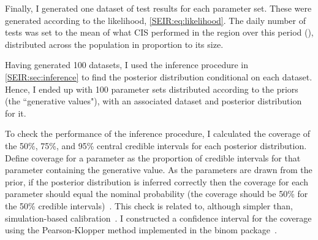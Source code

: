 \documentclass[thesis.tex]{subfiles}
\begin{document}
Finally, I generated one dataset of test results for each parameter set.
These were generated according to the likelihood, \cref{SEIR:eq:likelihood}.
The daily number of tests was set to the mean of what CIS performed in the region over this period (), distributed across the population in proportion to its size.

Having generated 100 datasets, I used the inference procedure in \cref{SEIR:sec:inference} to find the posterior distribution conditional on each dataset.
Hence, I ended up with 100 parameter sets distributed according to the priors (the ``generative values"), with an associated dataset and posterior distribution for it.

To check the performance of the inference procedure, I calculated the coverage of the 50\%, 75\%, and 95\% central credible intervals for each posterior distribution.
Define coverage for a parameter as the proportion of credible intervals for that parameter containing the generative value.
As the parameters are drawn from the prior, if the posterior distribution is inferred correctly then the coverage for each parameter should equal the nominal probability (\eg the coverage should be 50\% for the 50\% credible intervals)~\autocite{cookValidation}.
This check is related to, although simpler than, simulation-based calibration~\autocite{taltsValidating}.
I constructed a confidence interval for the coverage using the Pearson-Klopper method implemented in the binom package~\autocite{binom1-1}.
\end{document}
